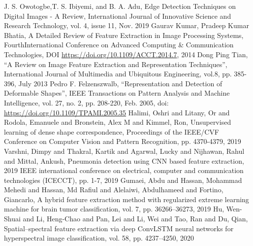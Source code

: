 \documentclass[conference]{IEEEtran}
\begin{document}




\begin{thebibliography}{00}

 J. S. Owotogbe,T. S. Ibiyemi, and B. A. Adu, Edge Detection Techniques on Digital Images - A Review, International Journal of Innovative Science and Research Technology, vol. 4, issue 11, Nov. 2019
 Gaurav Kumar, Pradeep Kumar Bhatia, A Detailed Review of Feature Extraction in Image Processing Systems, FourthInternational Conference on Advanced Computing \& Communication Technologies, DOI \url{https://doi.org/10.1109/ACCT.2014.7}, 2014
 Dong Ping Tian, ``A Review on Image Feature Extraction and Representation Techniques'', International Journal of Multimedia and Ubiquitous Engineering, vol.8, pp. 385-396, July 2013
 Pedro F. Felzenszwalb, ``Representation and Detection of Deformable Shapes'', IEEE Transactions on Pattern Analysis and Machine Intelligence, vol. 27, no. 2, pp. 208-220, Feb. 2005, doi: \url{https://doi.org/10.1109/TPAMI.2005.35} 
 Halimi, Oshri and Litany, Or and Rodola, Emanuele and Bronstein, Alex M and Kimmel, Ron, Unsupervised learning of dense shape correspondence, Proceedings of the IEEE/CVF Conference on Computer Vision and Pattern Recognition, pp. 4370-4379, 2019
 Varshni, Dimpy and Thakral, Kartik and Agarwal, Lucky and Nijhawan, Rahul and Mittal, Ankush, Pneumonia detection using CNN based feature extraction, 2019 IEEE international conference on electrical, computer and communication technologies (ICECCT), pp. 1-7, 2019
 Gumaei, Abdu and Hassan, Mohammad Mehedi and Hassan, Md Rafiul and Alelaiwi, Abdulhameed and Fortino, Giancarlo, A hybrid feature extraction method with regularized extreme learning machine for brain tumor classification, vol. 7, pp. 36266--36273, 2019
 Hu, Wen-Shuai and Li, Heng-Chao and Pan, Lei and Li, Wei and Tao, Ran and Du, Qian, Spatial--spectral feature extraction via deep ConvLSTM neural networks for hyperspectral image classification, vol. 58, pp. 4237--4250, 2020


\end{thebibliography}
\end{document}
